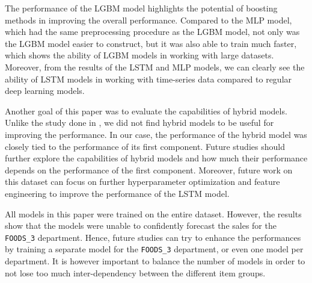 The performance of the LGBM model highlights the potential of boosting methods in improving the overall performance. 
Compared to the MLP model, which had the same preprocessing procedure as the LGBM model, not only was the LGBM model easier to construct, but it was also able to train much faster, which shows the ability of LGBM models in working with large datasets.
Moreover, from the results of the LSTM and MLP models, we can clearly see the ability of LSTM models in working with time-series data compared to regular deep learning models.

Another goal of this paper was to evaluate the capabilities of hybrid models.
Unlike the study done in \cite{c8}, we did not find hybrid models to be useful for improving the performance.
In our case, the performance of the hybrid model was closely tied to the performance of its first component.
Future studies should further explore the capabilities of hybrid models and how much their performance depends on the performance of the first component.
Moreover, future work on this dataset can focus on further hyperparameter optimization and feature engineering to improve the performance of the LSTM model.

All models in this paper were trained on the entire dataset.
However, the results show that the models were unable to confidently forecast the sales for the \texttt{FOODS\_3} department. 
Hence, future studies can try to enhance the performances by training a separate model for the \texttt{FOODS\_3} department, or even one model per department.
It is however important to balance the number of models in order to not lose too much inter-dependency between the different item groups.